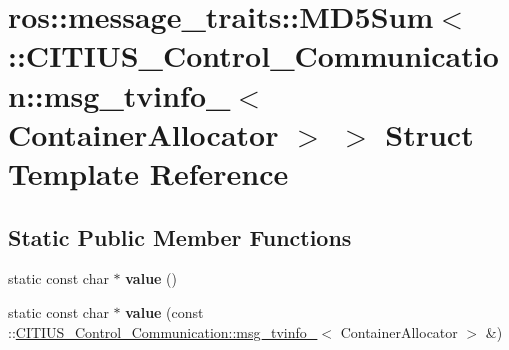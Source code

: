\hypertarget{structros_1_1message__traits_1_1_m_d5_sum_3_01_1_1_c_i_t_i_u_s___control___communication_1_1msg_0d089ac2c877d81c0be201541d57e889}{\section{ros\-:\-:message\-\_\-traits\-:\-:\-M\-D5\-Sum$<$ \-:\-:\-C\-I\-T\-I\-U\-S\-\_\-\-Control\-\_\-\-Communication\-:\-:msg\-\_\-tvinfo\-\_\-$<$ \-Container\-Allocator $>$ $>$ \-Struct \-Template \-Reference}
\label{structros_1_1message__traits_1_1_m_d5_sum_3_01_1_1_c_i_t_i_u_s___control___communication_1_1msg_0d089ac2c877d81c0be201541d57e889}
}
\subsection*{\-Static \-Public \-Member \-Functions}
\begin{DoxyCompactItemize}
\item 
\hypertarget{structros_1_1message__traits_1_1_m_d5_sum_3_01_1_1_c_i_t_i_u_s___control___communication_1_1msg_0d089ac2c877d81c0be201541d57e889_abc46a30d63c79a66a76b117717a9f460}{static const char $\ast$ {\bfseries value} ()}\label{structros_1_1message__traits_1_1_m_d5_sum_3_01_1_1_c_i_t_i_u_s___control___communication_1_1msg_0d089ac2c877d81c0be201541d57e889_abc46a30d63c79a66a76b117717a9f460}

\item 
\hypertarget{structros_1_1message__traits_1_1_m_d5_sum_3_01_1_1_c_i_t_i_u_s___control___communication_1_1msg_0d089ac2c877d81c0be201541d57e889_a5218a756f81910d711e760372e6c6901}{static const char $\ast$ {\bfseries value} (const \-::\hyperlink{struct_c_i_t_i_u_s___control___communication_1_1msg__tvinfo__}{\-C\-I\-T\-I\-U\-S\-\_\-\-Control\-\_\-\-Communication\-::msg\-\_\-tvinfo\-\_\-}$<$ \-Container\-Allocator $>$ \&)}\label{structros_1_1message__traits_1_1_m_d5_sum_3_01_1_1_c_i_t_i_u_s___control___communication_1_1msg_0d089ac2c877d81c0be201541d57e889_a5218a756f81910d711e760372e6c6901}

\end{DoxyCompactItemize}
